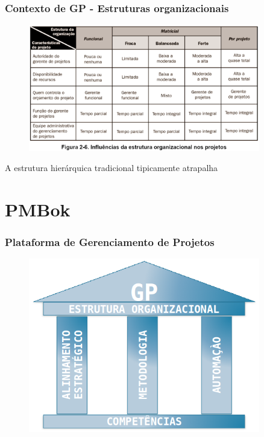     \begin{frame}
 \frametitle{Contexto de GP - Estruturas organizacionais}
 \begin{figure}
  \centering
  \includegraphics[width = 0.9\textwidth]{figs/fig11.png}
 \end{figure}
\end{frame}

\begin{frame}
 \begin{block}{}
  A estrutura hierárquica tradicional tipicamente atrapalha
 \end{block}
\end{frame}

\section{PMBok}
    \begin{frame}
 \frametitle{Plataforma de Gerenciamento de Projetos}
 \begin{figure}
  \centering
  \includegraphics[width = 0.9\textwidth]{figs/fig12.png}
 \end{figure}
\end{frame}

